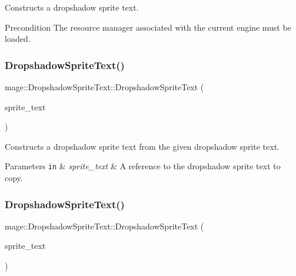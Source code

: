 Constructs a dropshadow sprite text.

\begin{DoxyPrecond}{Precondition}
The resource manager associated with the current engine must be loaded. 
\end{DoxyPrecond}
\hypertarget{classmage_1_1_dropshadow_sprite_text_af0a9422a32ed8962d6c691fe76f44c30}{}\label{classmage_1_1_dropshadow_sprite_text_af0a9422a32ed8962d6c691fe76f44c30} 
\subsubsection{\texorpdfstring{Dropshadow\+Sprite\+Text()}{DropshadowSpriteText()}\hspace{0.1cm}{\footnotesize\ttfamily [2/3]}}
{\footnotesize\ttfamily mage\+::\+Dropshadow\+Sprite\+Text\+::\+Dropshadow\+Sprite\+Text (\begin{DoxyParamCaption}\item[{const \hyperlink{classmage_1_1_dropshadow_sprite_text}{Dropshadow\+Sprite\+Text} \&}]{sprite\+\_\+text }\end{DoxyParamCaption})\hspace{0.3cm}{\ttfamily [default]}}

Constructs a dropshadow sprite text from the given dropshadow sprite text.


\begin{DoxyParams}[1]{Parameters}
\mbox{\tt in}  & {\em sprite\+\_\+text} & A reference to the dropshadow sprite text to copy. \\
\hline
\end{DoxyParams}
\hypertarget{classmage_1_1_dropshadow_sprite_text_a238b873f7b4d818cc3640e8f363f760e}{}\label{classmage_1_1_dropshadow_sprite_text_a238b873f7b4d818cc3640e8f363f760e} 
\subsubsection{\texorpdfstring{Dropshadow\+Sprite\+Text()}{DropshadowSpriteText()}\hspace{0.1cm}{\footnotesize\ttfamily [3/3]}}
{\footnotesize\ttfamily mage\+::\+Dropshadow\+Sprite\+Text\+::\+Dropshadow\+Sprite\+Text (\begin{DoxyParamCaption}\item[{\hyperlink{classmage_1_1_dropshadow_sprite_text}{Dropshadow\+Sprite\+Text} \&\&}]{sprite\+\_\+text }\end{DoxyParamCaption})\hspace{0.3cm}{\ttfamily [default]}}

